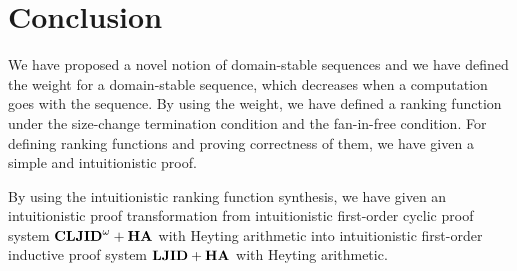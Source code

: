 \section{Conclusion}

We have proposed a novel notion of domain-stable sequences and
we have defined the weight for a domain-stable sequence, which 
decreases when a computation goes with the sequence.
By using the weight, we have defined a ranking function under the
size-change termination condition and the fan-in-free condition.
For defining ranking functions and proving
correctness of them, we have given a simple and intuitionistic proof.

By using the intuitionistic ranking function synthesis,
we have given an intuitionistic proof transformation
from intuitionistic first-order cyclic proof system ${{\bf CLJID}^\omega+{\bf HA}}$
with Heyting arithmetic
into intuitionistic first-order inductive proof system ${{\bf LJID}+{\bf HA}}$
with Heyting arithmetic.

